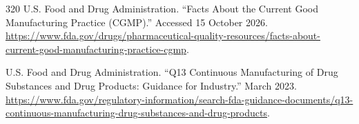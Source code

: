 \documentclass[12pt,oneside]{book}
\begin{document}
\begin{thebibliography}{320}
U.S. Food and Drug Administration. ``Facts About the Current Good Manufacturing
Practice (CGMP).'' Accessed 15 October 2026.
\url{https://www.fda.gov/drugs/pharmaceutical-quality-resources/facts-about-current-good-manufacturing-practice-cgmp}.

U.S. Food and Drug Administration. ``Q13 Continuous Manufacturing of Drug
Substances and Drug Products: Guidance for Industry.'' March 2023.
\url{https://www.fda.gov/regulatory-information/search-fda-guidance-documents/q13-continuous-manufacturing-drug-substances-and-drug-products}.

\end{thebibliography}
\end{document}
